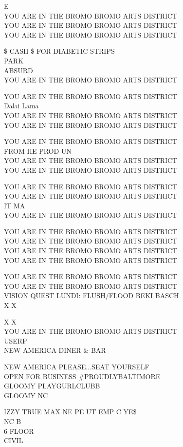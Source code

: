 \documentclass[10pt,letterpaper]{article}
\begin{document}
E\\
YOU ARE IN THE BROMO BROMO ARTS DISTRICT\\
YOU ARE IN THE BROMO BROMO ARTS DISTRICT\\
YOU ARE IN THE BROMO BROMO ARTS DISTRICT

\$ CASH \$ FOR DIABETIC STRIPS\\
PARK\\
ABSURD\\
YOU ARE IN THE BROMO BROMO ARTS DISTRICT

YOU ARE IN THE BROMO BROMO ARTS DISTRICT\\
Dalai Lama\\
YOU ARE IN THE BROMO BROMO ARTS DISTRICT\\
YOU ARE IN THE BROMO BROMO ARTS DISTRICT

YOU ARE IN THE BROMO BROMO ARTS DISTRICT\\
FROM HE PROD UN\\
YOU ARE IN THE BROMO BROMO ARTS DISTRICT\\
YOU ARE IN THE BROMO BROMO ARTS DISTRICT

YOU ARE IN THE BROMO BROMO ARTS DISTRICT\\
YOU ARE IN THE BROMO BROMO ARTS DISTRICT\\
IT MA\\
YOU ARE IN THE BROMO BROMO ARTS DISTRICT

YOU ARE IN THE BROMO BROMO ARTS DISTRICT\\
YOU ARE IN THE BROMO BROMO ARTS DISTRICT\\
YOU ARE IN THE BROMO BROMO ARTS DISTRICT\\
YOU ARE IN THE BROMO BROMO ARTS DISTRICT

YOU ARE IN THE BROMO BROMO ARTS DISTRICT\\
YOU ARE IN THE BROMO BROMO ARTS DISTRICT\\
VISION QUEST LUNDI: FLUSH/FLOOD BEKI BASCH\\
X X

X X\\
YOU ARE IN THE BROMO BROMO ARTS DISTRICT\\
USERP\\
NEW AMERICA DINER \& BAR

NEW AMERICA PLEASE...SEAT YOURSELF\\
OPEN FOR BUSINESS \#PROUDLYBALTIMORE\\
GLOOMY PLAYGURLCLUBB\\
GLOOMY NC

IZZY TRUE MAX NE PE UT EMP C YE\$\\
NC B\\
6 FLOOR\\
CIVIL
\end{document}
